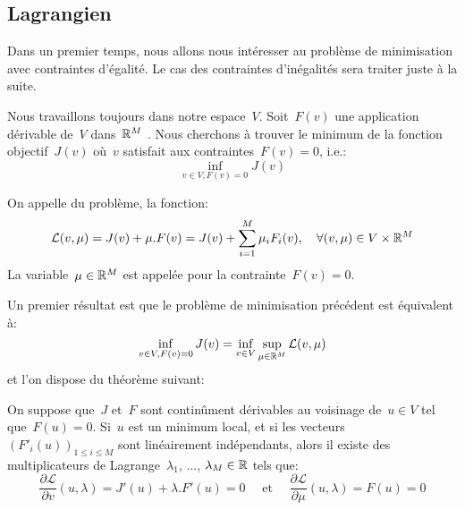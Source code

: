 \medskip
\subsection{Lagrangien}

Dans un premier temps, nous allons nous intéresser au problème de minimisation avec contraintes d'égalité. Le cas des contraintes d'inégalités sera traiter juste à la suite.

\medskip
\begin{definition}
Nous travaillons toujours dans notre espace~$V$.
Soit~$F(v)$ une application dérivable de~$V$ dans~$\mathbb R^M$ .
Nous cherchons à trouver le minimum de la fonction objectif~$J(v)$ où~$v$ satisfait aux contraintes~$F(v)=0$, i.e.:
\begin{equation}\label{Eq-LagEq}
\inf_{v\in V, F(v)=0} J(v)
\end{equation}

On appelle  du problème, la fonction:
\begin{equation}
\mathcal{L}(v,\mu) = J(v)+\mu.F(v) = J(v) + \displaystyle\sum_{i=1}^M \mu_iF_i(v), 
\quad \forall (v,\mu)\in V\times\mathbb R^M
\end{equation}
La variable~$\mu\in\mathbb R^M$ est appelée  pour la contrainte~$F(v)=0$.
\end{definition}

Un premier résultat est que le problème de minimisation précédent est équivalent à:
\begin{equation}
\inf_{v\in V, F(v)=0} J(v) = \inf_{v\in V} \sup_{\mu\in\mathbb R^M} \mathcal{L}(v,\mu)
\end{equation}
et l'on dispose du théorème suivant:
\begin{theoreme}
On suppose que~$J$ et~$F$ sont continûment dérivables au voisinage de~$u\in V$ tel que~$F(u)=0$. Si~$u$ est un minimum local, et si les vecteurs~$(F'_i(u))_{1\le i\le M}$ sont linéairement indépendants, alors il existe des multiplicateurs de Lagrange~$\lambda_1$, ..., $\lambda_M\in\mathbb R$ tels que:
\begin{equation}
\dfrac{\partial\mathcal{L}}{\partial v}(u,\lambda) = J'(u)+\lambda.F'(u)=0
\quad \text{ et }\quad
\dfrac{\partial\mathcal{L}}{\partial \mu}(u,\lambda) = F(u)=0
\end{equation}
\end{theoreme}


